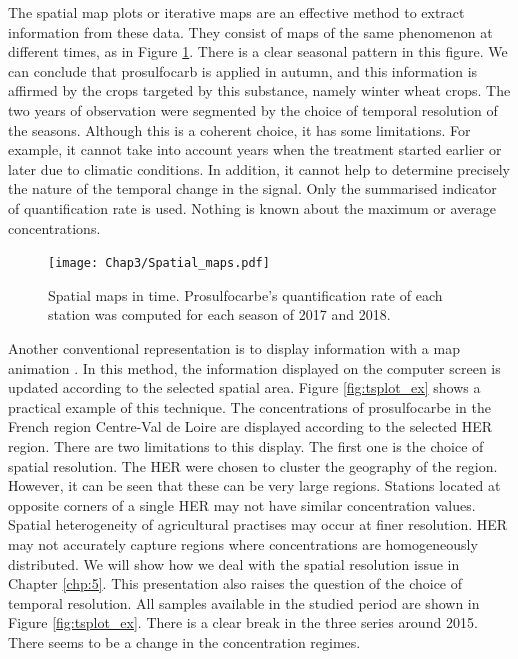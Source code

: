 The spatial map plots or iterative maps \citep{Andrienko2003} are an effective method to extract information from these data. They consist of maps of the same phenomenon at different times, as in Figure \ref{fig:spa_ex}. There is a clear seasonal pattern in this figure. We can conclude that prosulfocarb is applied in autumn, and this information is affirmed by the crops targeted by this substance, namely winter wheat crops. The two years of observation were segmented by the choice of temporal resolution of the seasons. Although this is a coherent choice, it has some limitations. For example, it cannot take into account years when the treatment started earlier or later due to climatic conditions. In addition, it cannot help to determine precisely the nature of the temporal change in the signal. Only the summarised indicator of quantification rate is used. Nothing is known about the maximum or average concentrations.
 
\begin{figure}[ht]
    \centering
    \texttt{[image: Chap3/Spatial\_maps.pdf]}
    \caption{Spatial maps in time. Prosulfocarbe's quantification rate of each station was computed for each season of 2017 and 2018.}
    \label{fig:spa_ex}
\end{figure}

Another conventional representation is to display information with a map animation \citep{Andrienko2003}. In this method, the information displayed on the computer screen is updated according to the selected spatial area. Figure \ref{fig:tsplot_ex} shows a practical example of this technique. The concentrations of prosulfocarbe in the French region Centre-Val de Loire are displayed according to the selected HER region. There are two limitations to this display. The first one is the choice of spatial resolution. The HER were chosen to cluster the geography of the region. However, it can be seen that these can be very large regions. Stations located at opposite corners of a single HER may not have similar concentration values. Spatial heterogeneity of agricultural practises may occur at finer resolution. HER may not accurately capture regions where concentrations are homogeneously distributed. We will show how we deal with the spatial resolution issue in Chapter \ref{chp:5}. This presentation also raises the question of the choice of temporal resolution. All samples available in the studied period are shown in Figure \ref{fig:tsplot_ex}. There is a clear break in the three series around 2015. There seems to be a change in the concentration regimes. \\

